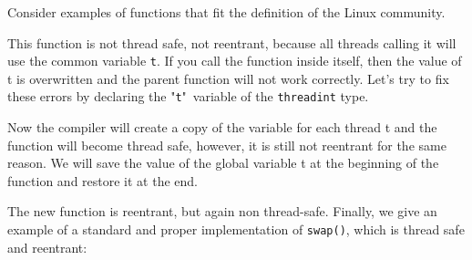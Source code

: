 {\begin{table}[H]
\begin{center}
		\end{center}
	\end{table}
	\par Consider examples of functions that fit the definition of the Linux community.
	\begin{figure}[H]
		
	\end{figure}
	\par This function is not thread safe, not reentrant, because all threads calling it will use the common variable \texttt{t}. If you call the function inside itself, then the value of t is overwritten and the parent function will not work correctly. Let's try to fix these errors by declaring the "\texttt{t}"\ variable of the \texttt{\textunderscore \textunderscore threadint} type.
	\begin{figure}[H]
		
	\end{figure}
	\par Now the compiler will create a copy of the variable for each thread t and the function will become thread safe, however, it is still not reentrant for the same reason. We will save the value of the global variable t at the beginning of the function and restore it at the end.
	\begin{figure}[H]
		
	\end{figure}
	\par The new function is reentrant, but again non thread-safe. Finally, we give an example of a standard and proper implementation of \texttt{swap()}, which is thread safe and reentrant:
	\begin{figure}[H]
		
	\end{figure}
}
